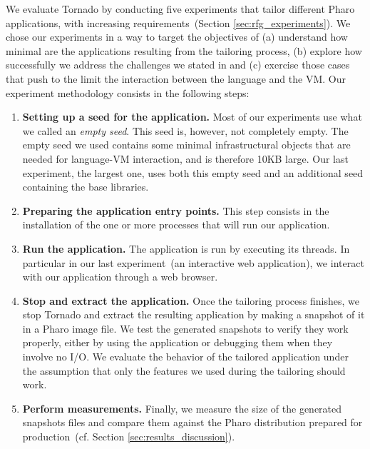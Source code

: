 %
We evaluate Tornado by conducting five experiments that tailor different Pharo applications, with increasing requirements~(Section \ref{sec:rfg_experiments}). We chose our experiments in a way to target the objectives of (a) understand how minimal are the applications resulting from the tailoring process, (b) explore how successfully we address the challenges we stated in  and (c) exercise those cases that push to the limit the interaction between the language and the VM. Our experiment methodology consists in the following steps:

\begin{enumerate}
\item \textbf{Setting up a seed for the application.} Most of our experiments use what we called an \emph{empty seed}. This seed is, however, not completely empty. The empty seed we used contains some minimal infrastructural objects that are needed for language-VM interaction, and is therefore 10KB large. Our last experiment, the largest one, uses both this empty seed and an additional seed containing the base libraries. 
\item \textbf{Preparing the application entry points.} This step consists in the installation of the one or more processes that will run our application.
\item \textbf{Run the application.} The application is run by executing its threads. In particular in our last experiment~(an interactive web application), we interact with our application through a web browser. 
\item \textbf{Stop and extract the application.} Once the tailoring process finishes, we stop Tornado and extract the resulting application by making a snapshot of it in a Pharo image file. We test the generated snapshots to verify they work properly, either by using the application or debugging them when they involve no I/O. We evaluate the behavior of the tailored application under the assumption that only the features we used during the tailoring should work.
\item \textbf{Perform measurements.} Finally, we measure the size of the generated snapshots files and compare them against the Pharo distribution prepared for production~(cf. Section \ref{sec:results_discussion}).
\end{enumerate}

